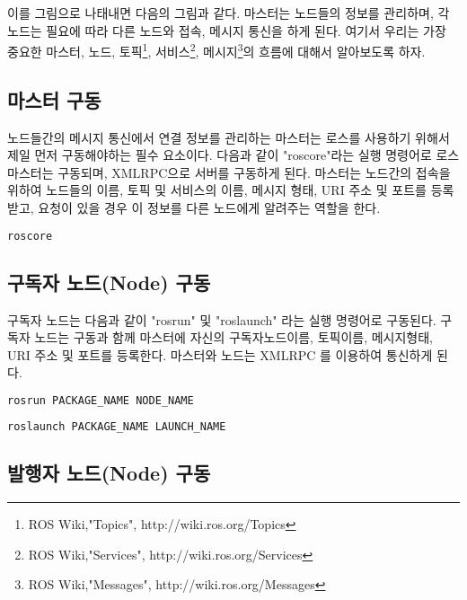 이를 그림으로 나태내면 다음의 그림과 같다. 마스터는 노드들의 정보를 관리하며, 각 노드는 필요에 따라 다른 노드와 접속, 메시지 통신을 하게 된다. 여기서 우리는 가장 중요한 마스터, 노드, 토픽\footnote{ROS Wiki,"Topics", http://wiki.ros.org/Topics}, 서비스\footnote{ROS Wiki,"Services", http://wiki.ros.org/Services}, 메시지\footnote{ROS Wiki,"Messages", http://wiki.ros.org/Messages}의 흐름에 대해서 알아보도록 하자.

\subsection{마스터 구동}

노드들간의 메시지 통신에서 연결 정보를 관리하는 마스터는 로스를 사용하기 위해서 제일 먼저 구동해야하는 필수 요소이다. 다음과 같이 "roscore"라는 실행 명령어로 로스 마스터는 구동되며, XMLRPC으로 서버를 구동하게 된다. 마스터는 노드간의 접속을 위하여 노드들의 이름, 토픽 및 서비스의 이름, 메시지 형태, URI 주소 및 포트를  등록받고, 요청이 있을 경우 이 정보를 다른 노드에게 알려주는 역할을 한다. 

\begin{lstlisting}[language=bash]
roscore
\end{lstlisting}

\subsection{구독자 노드(Node) 구동}

구독자 노드는 다음과 같이  "rosrun" 및 "roslaunch" 라는 실행 명령어로 구동된다. 구독자 노드는 구동과 함께 마스터에 자신의 구독자노드이름, 토픽이름, 메시지형태, URI 주소 및 포트를 등록한다. 마스터와 노드는 XMLRPC 를 이용하여 통신하게 된다.

\begin{lstlisting}[language=bash]
rosrun PACKAGE_NAME NODE_NAME
\end{lstlisting}

\begin{lstlisting}[language=bash]
roslaunch PACKAGE_NAME LAUNCH_NAME
\end{lstlisting}

\subsection{발행자 노드(Node) 구동}

